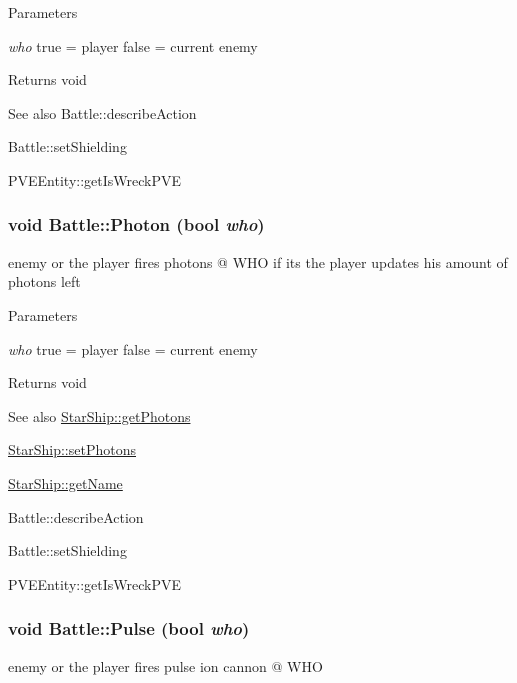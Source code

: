 \begin{DoxyParams}{Parameters}
\item[{\em who}]true = player false = current enemy\end{DoxyParams}
\begin{DoxyReturn}{Returns}
void
\end{DoxyReturn}
\begin{DoxySeeAlso}{See also}
Battle::describeAction 

Battle::setShielding

PVEEntity::getIsWreckPVE 
\end{DoxySeeAlso}
\hypertarget{classBattle_a4e3b6df23a451e85b0bd078e4a5692fa}{
\subsubsection[{Photon}]{\setlength{\rightskip}{0pt plus 5cm}void Battle::Photon (bool {\em who})}}
\label{dd/dfd/classBattle_a4e3b6df23a451e85b0bd078e4a5692fa}
enemy or the player fires photons @ WHO if its the player updates his amount of photons left


\begin{DoxyParams}{Parameters}
\item[{\em who}]true = player false = current enemy\end{DoxyParams}
\begin{DoxyReturn}{Returns}
void
\end{DoxyReturn}
\begin{DoxySeeAlso}{See also}
\hyperlink{classStarShip_a48df1266b1b5d8ed36ad91bc0ac8e53b}{StarShip::getPhotons} 

\hyperlink{classStarShip_a207cd846544ef333a25b14d737fa934a}{StarShip::setPhotons} 

\hyperlink{classStarShip_a822cba8f4276378a9c4cec72213e1e80}{StarShip::getName}

Battle::describeAction 

Battle::setShielding

PVEEntity::getIsWreckPVE 
\end{DoxySeeAlso}
\hypertarget{classBattle_abb853e7323e8c06115d261476eb60da6}{
\subsubsection[{Pulse}]{\setlength{\rightskip}{0pt plus 5cm}void Battle::Pulse (bool {\em who})}}
\label{dd/dfd/classBattle_abb853e7323e8c06115d261476eb60da6}
enemy or the player fires pulse ion cannon @ WHO


